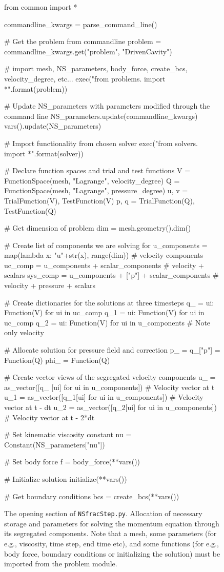 \documentclass[final,3p,times,twocolumn]{elsarticle}
\newcommand{\inpyth}{\lstinline[style=inlinestyle]} %[]%
\begin{document}
\begin{figure*}
\begin{python}
from common import *

commandline_kwargs = parse_command_line()

# Get the problem from commandline
problem = commandline_kwargs.get("problem", "DrivenCavity")

# import mesh, NS_parameters, body_force, create_bcs, velocity_degree, etc...
exec("from problems.{} import *".format(problem))

# Update NS_parameters with parameters modified through the command line 
NS_parameters.update(commandline_kwargs)
vars().update(NS_parameters)  

# Import functionality from chosen solver
exec("from solvers.{} import *".format(solver))

# Declare function spaces and trial and test functions
V = FunctionSpace(mesh, "Lagrange", velocity_degree)
Q = FunctionSpace(mesh, "Lagrange", pressure_degree)
u, v = TrialFunction(V), TestFunction(V)
p, q = TrialFunction(Q), TestFunction(Q)

# Get dimension of problem
dim = mesh.geometry().dim()

# Create list of components we are solving for
u_components = map(lambda x: "u"+str(x), range(dim))  # velocity components
uc_comp  =  u_components + scalar_components          # velocity + scalars
sys_comp = u_components + ["p"] + scalar_components   # velocity + pressure + scalars

# Create dictionaries for the solutions at three timesteps
q_  = {ui: Function(V) for ui in uc_comp}
q_1 = {ui: Function(V) for ui in uc_comp}
q_2 = {ui: Function(V) for ui in u_components} # Note only velocity

# Allocate solution for pressure field and correction
p_ = q_["p"] = Function(Q)
phi_ = Function(Q)

# Create vector views of the segregated velocity components    
u_  = as_vector([q_ [ui] for ui in u_components]) # Velocity vector at t
u_1 = as_vector([q_1[ui] for ui in u_components]) # Velocity vector at t - dt
u_2 = as_vector([q_2[ui] for ui in u_components]) # Velocity vector at t - 2*dt

# Set kinematic viscosity constant
nu = Constant(NS_parameters["nu"])

# Set body force
f = body_force(**vars())

# Initialize solution
initialize(**vars())

# Get boundary conditions
bcs = create_bcs(**vars())

\end{python}
\caption{The opening section of \inpyth{NSfracStep.py}. Allocation of necessary storage and parameters for solving the momentum equation through its segregated components. Note that a mesh, some parameters (for e.g., viscosity, time step, end time etc), and some functions (for e.g., body force, boundary conditions or initializing the solution)  must be imported from the problem module. }
\label{lst:allocation}
\end{figure*}
\end{document}
